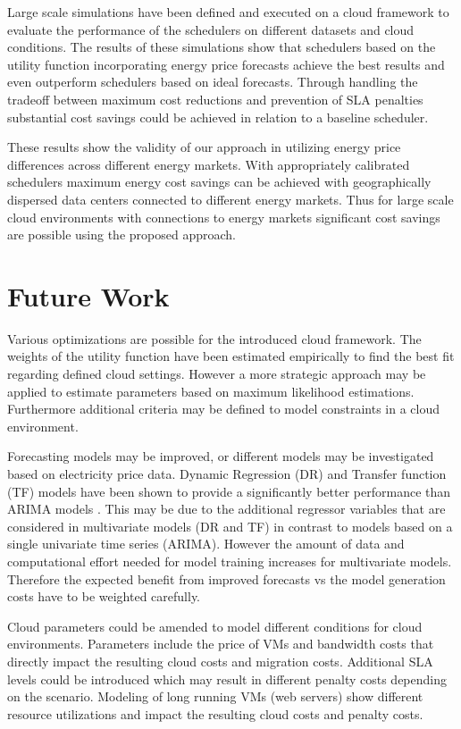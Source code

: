 Large scale simulations have been defined and executed on a cloud framework to evaluate the performance of the schedulers on different datasets and cloud conditions. The results of these simulations show that schedulers based on the utility function incorporating energy price forecasts achieve the best results and even outperform schedulers based on ideal forecasts. Through handling the tradeoff between maximum cost reductions and prevention of SLA penalties substantial cost savings could be achieved in relation to a baseline scheduler. 

These results show the validity of our approach in utilizing energy price differences across different energy markets. With appropriately calibrated schedulers maximum energy cost savings can be achieved with geographically dispersed data centers connected to different energy markets. Thus for large scale cloud environments with connections to energy markets significant cost savings are possible using the proposed approach. 





\section{Future Work}


Various optimizations are possible for the introduced cloud framework. The weights of the utility function have been estimated empirically to find the best fit regarding defined cloud settings. However a more strategic approach may be applied to estimate parameters based on maximum likelihood estimations. Furthermore additional criteria may be defined to model constraints in a cloud environment. 

Forecasting models may be improved, or different models may be investigated based on electricity price data. 
Dynamic Regression (DR) and Transfer function (TF) models have been shown to provide a significantly better performance than ARIMA models \cite{aggarwal2009electricity,weron2005forecasting}. This may be due to the additional regressor variables that are considered in multivariate models (DR and TF) in contrast to models based on a single univariate time series (ARIMA). However the amount of data and computational effort needed for model training increases for multivariate models. Therefore the expected benefit from improved forecasts vs the model generation costs have to be weighted carefully. 

Cloud parameters could be amended to model different conditions for cloud environments. Parameters include the price of VMs and bandwidth costs that directly impact the resulting cloud costs and migration costs. Additional SLA levels could be introduced which may result in different penalty costs depending on the scenario. Modeling of long running VMs (web servers) show different resource utilizations and impact the resulting cloud costs and penalty costs. 

